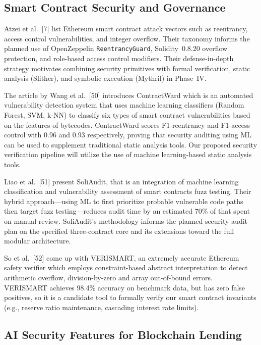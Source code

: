 \documentclass[12pt,a4paper]{report}
\begin{document}
\subsection{Smart Contract Security and Governance}

Atzei et al.~[7] list Ethereum smart contract attack vectors such as reentrancy, access control vulnerabilities, and integer overflow. Their taxonomy informs the planned use of OpenZeppelin \texttt{ReentrancyGuard}, Solidity~0.8.20 overflow protection, and role-based access control modifiers. Their defense-in-depth strategy motivates combining security primitives with formal verification, static analysis (Slither), and symbolic execution (Mythril) in Phase~IV.

The article by Wang et al.~[50] introduces ContractWard which is an automated vulnerability detection system that uses machine learning classifiers (Random Forest, SVM, k-NN) to classify six types of smart contract vulnerabilities based on the features of bytecodes. ContractWard scores F1-reentrancy and F1-access control with 0.96 and 0.93 respectively, proving that security auditing using ML can be used to supplement traditional static analysis tools. Our proposed security verification pipeline will utilize the use of machine learning-based static analysis tools.

Liao et al.~[51] present SoliAudit, that is an integration of machine learning classification and vulnerability assessment of smart contracts fuzz testing. Their hybrid approach---using ML to first prioritize probable vulnerable code paths then target fuzz testing---reduces audit time by an estimated 70\% of that spent on manual review. SoliAudit's methodology informs the planned security audit plan on the specified three-contract core and its extensions toward the full modular architecture.

So et al.~[52] come up with VERISMART, an extremely accurate Ethereum safety verifier which employs constraint-based abstract interpretation to detect arithmetic overflow, division-by-zero and array out-of-bound errors. VERISMART achieves 98.4\% accuracy on benchmark data, but has zero false positives, so it is a candidate tool to formally verify our smart contract invariants (e.g., reserve ratio maintenance, cascading interest rate limits).

\subsection{AI Security Features for Blockchain Lending}
\end{document}

